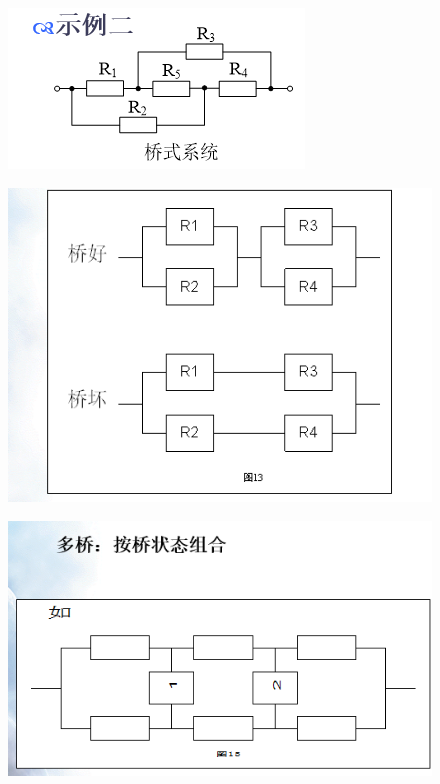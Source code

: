 \begin{figure}[H]
	\centering
	\includegraphics[width=0.7\linewidth]{figures/screenshot098}
	\caption{}
	\label{fig:screenshot098}
\end{figure}
\begin{figure}[H]
	\centering
	\includegraphics[width=0.7\linewidth]{figures/screenshot099}
	\caption{}
	\label{fig:screenshot099}
\end{figure}
\begin{figure}[H]
	\centering
	\includegraphics[width=0.7\linewidth]{figures/screenshot100}
	\caption{}
	\label{fig:screenshot100}
\end{figure}
